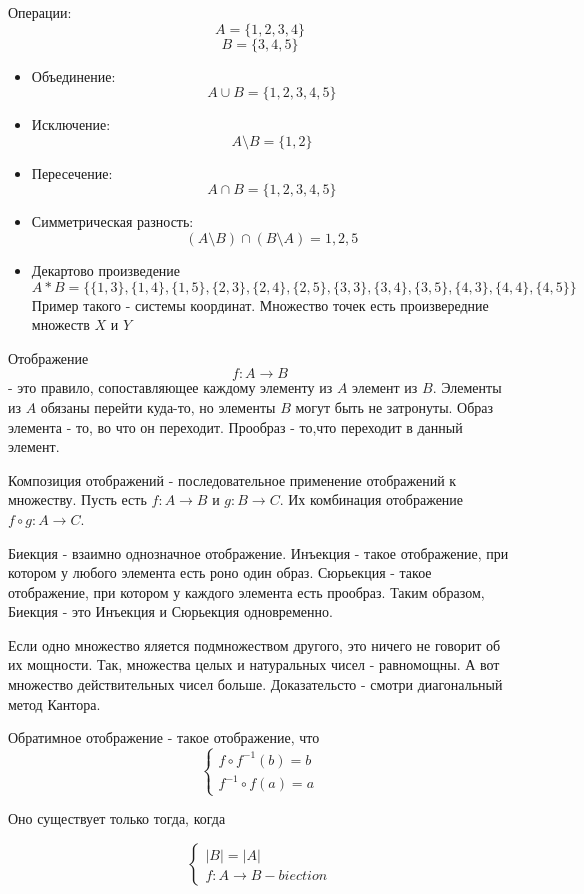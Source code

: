 \documentclass{article}
\begin{document}
Операции:
$$A = \{1,2,3,4\}$$
$$B = \{3,4,5\}$$
\begin{itemize}
\item{
Объединение:
$$A\cup B = \{1,2,3,4,5\}$$
}
\item{
Исключение:
$$A \setminus B = \{1,2\}$$
}

\item{
Пересечение:
$$A\cap B = \{1,2,3,4,5\}$$
}


\item{
Симметрическая разность:
$$(A\setminus B) \cap (B\setminus A) = {1,2,5}$$
}


\item{
Декартово произведение
$$A*B = \{\{1,3\}, \{1,4\}, \{1,5\}, \{2,3\} ,\{2,4\},\{2,5\},\{3,3\},\{3,4\},\{3,5\},\{4,3\},\{4,4\},\{4,5\}\}$$
Пример такого - системы координат. Множество точек есть произвередние множеств $X$ и $Y$
}

\end{itemize}

Отображение $$f:A\to B$$ - это правило, сопоставляющее каждому элементу из $A$  элемент из $B$. Элементы из $A$ обязаны перейти куда-то, но элементы $B$ могут быть не затронуты. Образ элемента - то, во что он переходит. Прообраз - то,что переходит в данный элемент.

Композиция отображений - последовательное применение отображений к множеству. Пусть есть $f:A\to B$ и $g:B\to C$. Их комбинация отображение $f\circ g: A \to C$.

Биекция - взаимно однозначное отображение. Инъекция - такое отображение, при котором у любого элемента есть роно один образ. Сюрьекция - такое отображение, при котором у каждого элемента есть прообраз. Таким образом, Биекция - это Инъекция и Сюрьекция одновременно.

Если одно множество яляется подмножеством другого, это ничего не говорит об их мощности. Так, множества целых и натуральных чисел - равномощны. А вот множество действительных чисел больше. Доказательсто - смотри диагональный метод Кантора.

Обратимное отображение - такое отображение, что 
$$\begin{cases}
f\circ f^{-1}(b) = b
\\
f^{-1} \circ f (a) = a
\end{cases}$$

Оно существует только тогда, когда 

$$\begin{cases}
|B| = |A|
\\
f:A \to B - biection
\end{cases}$$
\end{document}
